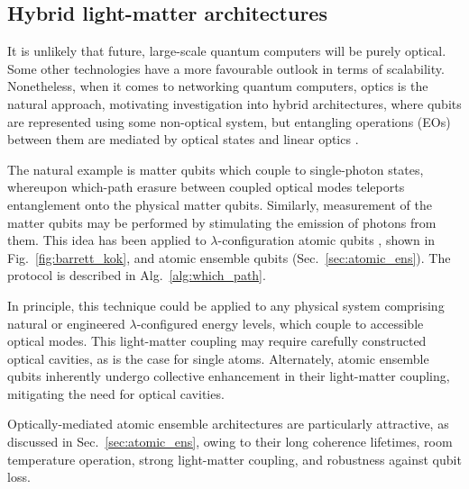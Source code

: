 
%
%

\subsection{Hybrid light-matter architectures} \label{sec:hybrid} 

It is unlikely that future, large-scale quantum computers will be purely optical. Some other technologies have a more favourable outlook in terms of scalability. Nonetheless, when it comes to networking quantum computers, optics is the natural approach, motivating investigation into hybrid architectures, where qubits are represented using some non-optical system, but entangling operations (EOs) between them are mediated by optical states and linear optics \cite{bib:Duan06, bib:Beugnon06}.

The natural example is matter qubits which couple to single-photon states, whereupon which-path erasure between coupled optical modes teleports entanglement onto the physical matter qubits. Similarly, measurement of the matter qubits may be performed by stimulating the emission of photons from them. This idea has been applied to $\lambda$-configuration atomic qubits \cite{bib:BarrettKok05}, shown in Fig.~\ref{fig:barrett_kok}, and atomic ensemble qubits \cite{bib:RohdeAtEns10} (Sec.~\ref{sec:atomic_ens}). The protocol is described in Alg.~\ref{alg:which_path}.

In principle, this technique could be applied to any physical system comprising natural or engineered $\lambda$-configured energy levels, which couple to accessible optical modes. This light-matter coupling may require carefully constructed optical cavities, as is the case for single atoms. Alternately, atomic ensemble qubits inherently undergo collective enhancement in their light-matter coupling, mitigating the need for optical cavities.

Optically-mediated atomic ensemble architectures are particularly attractive, as discussed in Sec.~\ref{sec:atomic_ens}, owing to their long coherence lifetimes, room temperature operation, strong light-matter coupling, and robustness against qubit loss.

